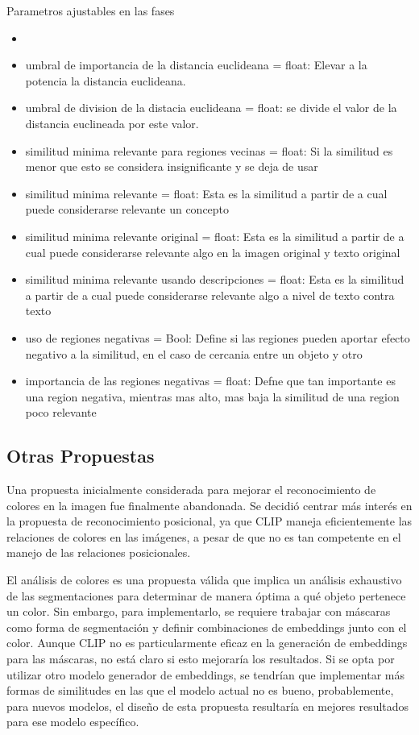  Parametros ajustables en las fases
\begin{itemize}
    \item 
    \item umbral de importancia de la distancia euclideana = float: Elevar a la potencia la distancia euclideana.
    \item umbral de division de la distacia euclideana = float: se divide el valor de la distancia euclineada por este valor.
    \item similitud minima relevante para regiones vecinas = float: Si la similitud es menor que esto se considera insignificante y se deja de usar
    \item similitud minima relevante = float: Esta es la similitud a partir de a cual puede considerarse relevante un concepto
    \item similitud minima relevante original = float: Esta es la similitud a partir de a cual puede considerarse relevante algo en la imagen original y texto original
    \item similitud minima relevante usando descripciones = float: Esta es la similitud a partir de a cual puede considerarse relevante algo a nivel de texto contra texto
    \item uso de regiones negativas = Bool: Define si las regiones pueden aportar efecto negativo a la similitud, en el caso de cercania entre un objeto y otro
    \item importancia de las regiones negativas = float: Defne que tan importante es una region negativa, mientras mas alto, mas baja la similitud de una region poco relevante
\end{itemize}

\subsection*{Otras Propuestas}

Una propuesta inicialmente considerada para mejorar el reconocimiento de colores en la imagen fue finalmente abandonada. Se decidió centrar más interés en la propuesta de reconocimiento posicional, ya que CLIP maneja eficientemente las relaciones de colores en las imágenes, a pesar de que no es tan competente en el manejo de las relaciones posicionales.

El análisis de colores es una propuesta válida que implica un análisis exhaustivo de las segmentaciones para determinar de manera óptima a qué objeto pertenece un color. Sin embargo, para implementarlo, se requiere trabajar con máscaras como forma de segmentación y definir combinaciones de embeddings junto con el color. Aunque CLIP no es particularmente eficaz en la generación de embeddings para las máscaras, no está claro si esto mejoraría los resultados. Si se opta por utilizar otro modelo generador de embeddings, se tendrían que implementar más formas de similitudes en las que el modelo actual no es bueno, probablemente, para nuevos modelos, el dise\~no de esta propuesta resultaría en mejores resultados para ese modelo específico.

